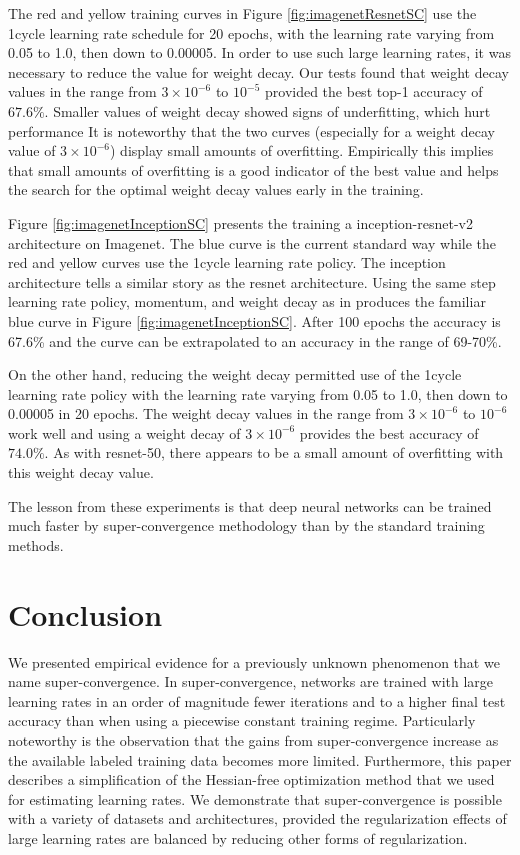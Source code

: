 \documentclass{article}
\begin{document}
The red and yellow training curves in Figure \ref{fig:imagenetResnetSC} use the 1cycle learning rate schedule for 20 epochs, with the learning rate varying from 0.05 to 1.0, then down to 0.00005.  In order to use such large learning rates, it was necessary to reduce the value for weight decay.  Our tests found that weight decay values in the range from $3 \times 10^{-6}$ to $10^{-5}$ provided the best top-1 accuracy of $67.6\%$. Smaller values of weight decay showed signs of underfitting, which hurt performance  It is noteworthy that the two curves (especially for a weight decay value of $3 \times 10^{-6}$) display small amounts of overfitting.  Empirically this implies that small amounts of overfitting is a good indicator of the best value and helps the search for the optimal weight decay values early in the training.

Figure \ref{fig:imagenetInceptionSC} presents the training a inception-resnet-v2 architecture on Imagenet.  The blue curve is the current standard way while the red and yellow curves use the 1cycle learning rate policy.  The inception architecture tells a similar story as the resnet architecture.  Using the same step learning rate policy, momentum, and weight decay as in  \cite{szegedy2017inception} produces the familiar blue curve in Figure \ref{fig:imagenetInceptionSC}.  After 100 epochs the accuracy is 67.6\% and the curve can be extrapolated to an accuracy in the range of 69-70\%.

On the other hand, reducing the weight decay permitted use of the 1cycle learning rate policy with the learning rate varying from 0.05 to 1.0, then down to 0.00005 in 20 epochs.  The weight decay values in the range from $3 \times 10^{-6}$ to $10^{-6}$ work well and  using a weight decay of $3 \times 10^{-6}$ provides the best accuracy of $ 74.0\%$.  As with resnet-50, there appears to be a small amount of overfitting with this weight decay value. 

The lesson from these experiments is that deep neural networks can be trained much faster by super-convergence methodology than by the standard training methods.


\section{Conclusion}
\label{sec:conclusion}

We presented empirical evidence for a previously unknown phenomenon that we name super-convergence. In super-convergence, networks are trained with large learning rates in an order of magnitude fewer iterations and to a higher final test accuracy than when using a piecewise constant training regime.  Particularly noteworthy is the observation that the gains from super-convergence increase as the available labeled training data becomes more limited. Furthermore, this paper describes a simplification of the Hessian-free optimization method that we used for estimating learning rates. We demonstrate that super-convergence is possible with a variety of datasets and architectures, provided the regularization effects of large learning rates are balanced by reducing other forms of regularization.
\end{document}
